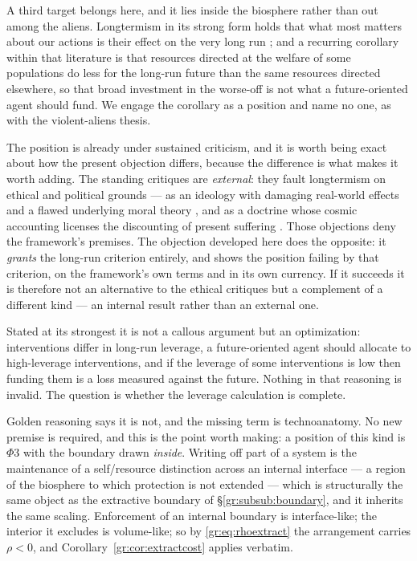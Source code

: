 \documentclass[11pt]{article}
\numberwithin{equation}{section}
\theoremstyle{plain}
\theoremstyle{definition}
\theoremstyle{remark}
\begin{document}
A third target belongs here, and it lies inside the biosphere rather
than out among the aliens. Longtermism in its strong form holds that
what most matters about our actions is their effect on the very long
run \cite{GM21}; and a recurring corollary within that literature is
that resources directed at the welfare of some populations do less for
the long-run future than the same resources directed elsewhere, so that
broad investment in the worse-off is not what a future-oriented agent
should fund. We engage the corollary as a position and name no one, as
with the violent-aliens thesis.

The position is already under sustained criticism, and it is worth being
exact about how the present objection differs, because the difference is
what makes it worth adding. The standing critiques are \emph{external}:
they fault longtermism on ethical and political grounds --- as an
ideology with damaging real-world effects and a flawed underlying moral
theory \cite{Crary23}, and as a doctrine whose cosmic accounting
licenses the discounting of present suffering \cite{Torres21}. Those
objections deny the framework's premises. The objection developed here
does the opposite: it \emph{grants} the long-run criterion entirely, and
shows the position failing by that criterion, on the framework's own
terms and in its own currency. If it succeeds it is therefore not an
alternative to the ethical critiques but a complement of a different
kind --- an internal result rather than an external one.

Stated at its strongest it is not a callous argument but an
optimization: interventions differ in long-run leverage, a
future-oriented agent should allocate to high-leverage interventions,
and if the leverage of some interventions is low then funding them is a
loss measured against the future. Nothing in that reasoning is invalid.
The question is whether the leverage calculation is complete.

Golden reasoning says it is not, and the missing term is technoanatomy.
No new premise is required, and this is the point worth making: a
position of this kind is $\Phi3$ with the boundary drawn \emph{inside}.
Writing off part of a system is the maintenance of a self/resource
distinction across an internal interface --- a region of the biosphere
to which protection is not extended --- which is structurally the same
object as the extractive boundary of \S\ref{gr:subsub:boundary}, and it
inherits the same scaling. Enforcement of an internal boundary is
interface-like; the interior it excludes is volume-like; so by
\eqref{gr:eq:rhoextract} the arrangement carries $\rho<0$, and
Corollary~\ref{gr:cor:extractcost} applies verbatim.
\end{document}
